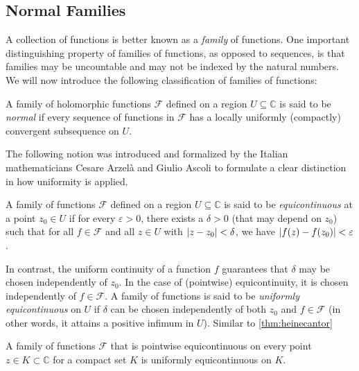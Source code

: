 \subsection{Normal Families}
A collection of functions is better known as a \textit{family} of functions. One important distinguishing property of families of functions, as opposed to sequences, is that families may be uncountable and may not be indexed by the natural numbers. We will now introduce the following classification of families of functions:
\begin{definition}\label{def:normalsubfamily}
    A family of holomorphic functions \(\mathcal{F}\) defined on a region \(U\subseteq\mathbb{C}\) is said to be \textit{normal} if every sequence of functions in \(\mathcal{F}\) has a locally uniformly (compactly) convergent subsequence on \(U\).
\end{definition}
The following notion was introduced and formalized by the Italian mathematicians Cesare Arzelà and Giulio Ascoli to formulate a clear distinction in how uniformity is applied.
\begin{definition}[Equicontinuity]\label{def:equicontinuity}
    A family of functions \(\mathcal{F}\) defined on a region \(U\subseteq\mathbb{C}\) is said to be \textit{equicontinuous} at a point \(z_0\in U\) if for every \(\varepsilon>0\), there exists a \(\delta>0\) (that may depend on \(z_0\)) such that for all \(f\in\mathcal{F}\) and all \(z\in U\) with \(\abs{z-z_0}<\delta\), we have \(\abs{f(z)-f(z_0)}<\varepsilon\).
\end{definition}
In contrast, the uniform continuity of a function \(f\) guarantees that \(\delta\) may be chosen independently of \(z_0\). In the case of (pointwise) equicontinuity, it is chosen independently of \(f\in\mathcal{F}\). A family of functions is said to be \textit{uniformly equicontinuous} on \(U\) if \(\delta\) can be chosen independently of both \(z_0\) and \(f\in\mathcal{F}\) (in other words, it attains a positive infimum in \(U\)). Similar to \cref{thm:heinecantor}
\begin{theorem}\label{thm:heinecantorfamily}
    A family of functions \(\mathcal{F}\) that is pointwise equicontinuous on every point \(z\in K\subset\mathbb{C}\) for a compact set \(K\) is uniformly equicontinuous on \(K\).
\end{theorem}
